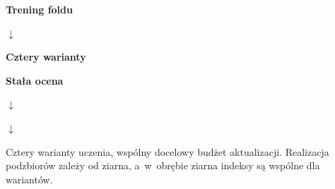 \begin{minipage}[t]{0.31\linewidth}\centering\textbf{Trening foldu}\par\medskip
{}\par\smallskip$\downarrow$\par\smallskip{}\end{minipage}
\hfill
\begin{minipage}[t]{0.31\linewidth}\centering\textbf{Cztery warianty}\par\medskip
{}\par\medskip{}\par\medskip{}\par\medskip{}\end{minipage}
\hfill
\begin{minipage}[t]{0.31\linewidth}\centering\textbf{Stała ocena}\par\medskip
{}\par\smallskip$\downarrow$\par\smallskip{}\par\smallskip$\downarrow$\par\smallskip{}\end{minipage}\par\medskip Cztery warianty uczenia, wspólny docelowy budżet aktualizacji. Realizacja podzbiorów zależy od ziarna, a~w~obrębie ziarna indeksy są wspólne dla wariantów.
